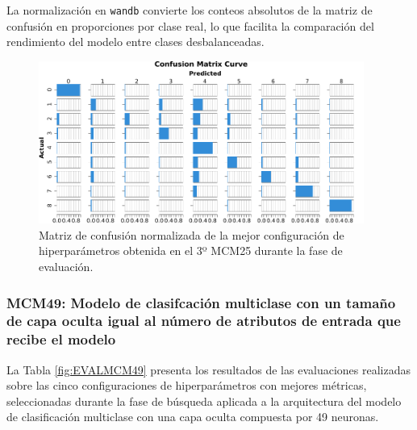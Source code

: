 La normalización en \texttt{wandb} convierte los conteos absolutos de la matriz de confusión en proporciones por clase real, lo que facilita la comparación del rendimiento del modelo entre clases desbalanceadas.

\begin{figure}[H]
    \centering
    \includegraphics[width=0.95\textwidth]{./img/evaluacion/matrices_confusion/MCNorm_EVAL_MCM25.pdf}
    \caption{Matriz de confusión normalizada de la mejor configuración de hiperparámetros obtenida en el 3º MCM25 durante la fase de evaluación.}
    \label{fig:MCNorm_EVAL_MCM25}
\end{figure}



\subsubsection{MCM49: Modelo de clasifcación multiclase con un tamaño de capa oculta igual al número de atributos de entrada que recibe el modelo}
La Tabla \ref{fig:EVALMCM49} presenta los resultados de las evaluaciones realizadas sobre las cinco configuraciones de hiperparámetros con mejores métricas, seleccionadas durante la fase de búsqueda aplicada a la arquitectura del modelo de clasificación multiclase con una capa oculta compuesta por 49 neuronas.


